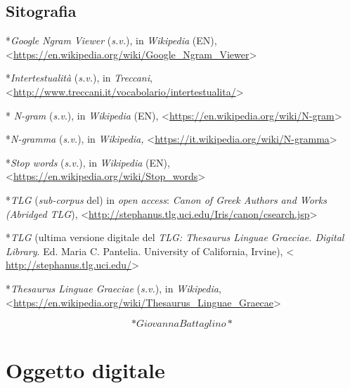 \documentclass[
  b5paper,
  twoside,
  11pt,
  chapterprefix=false,
  bibliography=totocnumbered,
  parskip=0]{scrbook}
\begin{document}
\hypertarget{sitografia-22}{%
\section*{Sitografia}\label{sitografia-22}}

*\emph{Google Ngram Viewer} (\emph{s.v.}), in \emph{Wikipedia} (EN),
\textless{}\href{https://en.wikipedia.org/wiki/Google_Ngram_Viewer}{{https://en.wikipedia.org/wiki/Google\_Ngram\_Viewer}}\textgreater{}

*\emph{Intertestualità} (\emph{s.v.}), in \emph{Treccani},
\textless{}\href{http://www.treccani.it/vocabolario/intertestualita/}{{http://www.treccani.it/vocabolario/intertestualita/}}\textgreater{}

* \emph{N-gram} (\emph{s.v}.), in \emph{Wikipedia} (EN),
\textless{}\href{https://en.wikipedia.org/wiki/N-gram}{{https://en.wikipedia.org/wiki/N-gram}}\textgreater{}

*\emph{N-gramma} (\emph{s.v.}), in \emph{Wikipedia,}
\textless{}\href{https://it.wikipedia.org/wiki/N-gramma}{{https://it.wikipedia.org/wiki/N-gramma}}\textgreater{}

*\emph{Stop words} (\emph{s.v.}), in \emph{Wikipedia} (EN),
\textless{}\href{https://en.wikipedia.org/wiki/Stop_words}{{https://en.wikipedia.org/wiki/Stop\_words}}\textgreater{}

*\emph{TLG} (\emph{sub-corpus} del) in \emph{open access}: \emph{Canon of Greek Authors and
Works (Abridged TLG}),
\textless{}\href{http://stephanus.tlg.uci.edu/Iris/canon/csearch.jsp}{{http://stephanus.tlg.uci.edu/Iris/canon/csearch.jsp}}\textgreater{}

*\emph{TLG} (ultima versione digitale del \emph{TLG: Thesaurus Linguae Graeciae.
Digital Library}. Ed. Maria C. Pantelia. University of California,
Irvine), \textless{}
\href{http://stephanus.tlg.uci.edu/}{{http://stephanus.tlg.uci.edu/}}\textgreater{}

*\emph{Thesaurus Linguae Graeciae} (\emph{s.v.}), in \emph{Wikipedia},
\textless{}\href{https://en.wikipedia.org/wiki/Thesaurus_Linguae_Graecae}{{https://en.wikipedia.org/wiki/Thesaurus\_Linguae\_Graecae}}\textgreater{}

\[*Giovanna Battaglino*\]

\hypertarget{oggetto-digitale}{%
\chapter{Oggetto digitale}\label{oggetto-digitale}}
\end{document}

